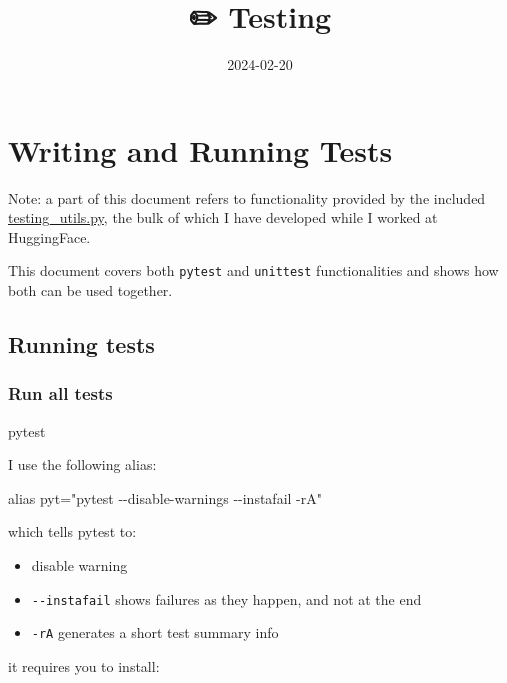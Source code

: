 \documentclass[
]{report}
\title{✏️ Testing}
\author{}
\date{2024-02-20}
\newenvironment{Shaded}{\begin{snugshade}}{\end{snugshade}}
\newcommand{\BuiltInTok}[1]{\textcolor[rgb]{0.00,0.23,0.31}{#1}}
\newcommand{\NormalTok}[1]{\textcolor[rgb]{0.00,0.23,0.31}{#1}}
\newcommand{\StringTok}[1]{\textcolor[rgb]{0.13,0.47,0.30}{#1}}
\providecommand{\tightlist}{%
  \setlength{\itemsep}{0pt}\setlength{\parskip}{0pt}}\usepackage{longtable,booktabs,array}
\begin{document}
\maketitle

\chapter{Writing and Running Tests}\label{writing-and-running-tests}

Note: a part of this document refers to functionality provided by the
included \url{testing_utils.py}, the bulk of which I have developed
while I worked at HuggingFace.

This document covers both \texttt{pytest} and \texttt{unittest}
functionalities and shows how both can be used together.

\section{Running tests}\label{running-tests}

\subsection{Run all tests}\label{run-all-tests}

\begin{Shaded}
\begin{Highlighting}[]
\NormalTok{pytest}
\end{Highlighting}
\end{Shaded}

I use the following alias:

\begin{Shaded}
\begin{Highlighting}[]
\BuiltInTok{alias}\NormalTok{ pyt=}\StringTok{"pytest {-}{-}disable{-}warnings {-}{-}instafail {-}rA"}
\end{Highlighting}
\end{Shaded}

which tells pytest to:

\begin{itemize}
\tightlist
\item
  disable warning
\item
  \texttt{-\/-instafail} shows failures as they happen, and not at the
  end
\item
  \texttt{-rA} generates a short test summary info
\end{itemize}

it requires you to install:
\end{document}
